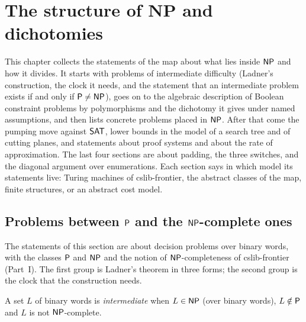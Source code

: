 \chapter{The structure of NP and dichotomies}
\label{chap:structure}

This chapter collects the statements of the map about what lies inside $\mathsf{NP}$ and how it divides.
It starts with problems of intermediate difficulty (Ladner's construction, the clock it needs, and the
statement that an intermediate problem exists if and only if $\mathsf{P} \neq \mathsf{NP}$), goes on to the
algebraic description of Boolean constraint problems by polymorphisms and the dichotomy it gives
under named assumptions, and then lists concrete problems placed in $\mathsf{NP}$. After that come the
pumping move against $\mathsf{SAT}$, lower bounds in the model of a search tree and of cutting planes, and
statements about proof systems and about the rate of approximation. The last four sections are about
padding, the three switches, and the diagonal argument over enumerations. Each section says in which
model its statements live: Turing machines of cslib-frontier, the abstract classes of the map, finite
structures, or an abstract cost model.

\section{Problems between $\mathsf{P}$ and the $\mathsf{NP}$-complete ones}
\label{sec:structure-ladner}

The statements of this section are about decision problems over binary words, with the classes
$\mathsf{P}$ and $\mathsf{NP}$ and the notion of $\mathsf{NP}$-completeness of cslib-frontier (Part~I). The first
group is Ladner's theorem in three forms; the second group is the clock that the construction
needs.

\begin{definition}
  \label{def:structure-intermedio}
  \leanok
  A set $L$ of binary words is \emph{intermediate} when $L \in \mathsf{NP}$ (over binary words), $L
  \notin \mathsf{P}$ and $L$ is not $\mathsf{NP}$-complete.
  \own{}
\end{definition}

